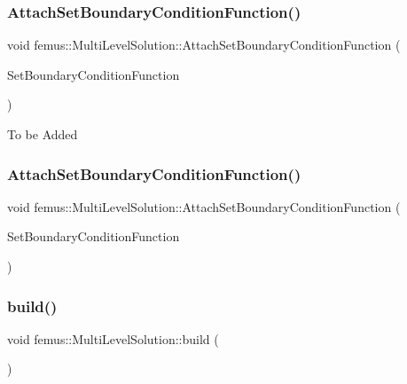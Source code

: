 \subsubsection{\texorpdfstring{Attach\+Set\+Boundary\+Condition\+Function()}{AttachSetBoundaryConditionFunction()}\hspace{0.1cm}{\footnotesize\ttfamily [1/2]}}
{\footnotesize\ttfamily void femus\+::\+Multi\+Level\+Solution\+::\+Attach\+Set\+Boundary\+Condition\+Function (\begin{DoxyParamCaption}\item[{Boundary\+Func}]{Set\+Boundary\+Condition\+Function }\end{DoxyParamCaption})}

To be Added \mbox{\label{classfemus_1_1_multi_level_solution_a9ef26adaa5c62a4d565d81f704cacf72}} 
\subsubsection{\texorpdfstring{Attach\+Set\+Boundary\+Condition\+Function()}{AttachSetBoundaryConditionFunction()}\hspace{0.1cm}{\footnotesize\ttfamily [2/2]}}
{\footnotesize\ttfamily void femus\+::\+Multi\+Level\+Solution\+::\+Attach\+Set\+Boundary\+Condition\+Function (\begin{DoxyParamCaption}\item[{Boundary\+Func\+M\+L\+Prob}]{Set\+Boundary\+Condition\+Function }\end{DoxyParamCaption})}

\mbox{\label{classfemus_1_1_multi_level_solution_a7d6865114da00ad92090d916217cad3d}} 
\subsubsection{\texorpdfstring{build()}{build()}}
{\footnotesize\ttfamily void femus\+::\+Multi\+Level\+Solution\+::build (\begin{DoxyParamCaption}{ }\end{DoxyParamCaption})}

